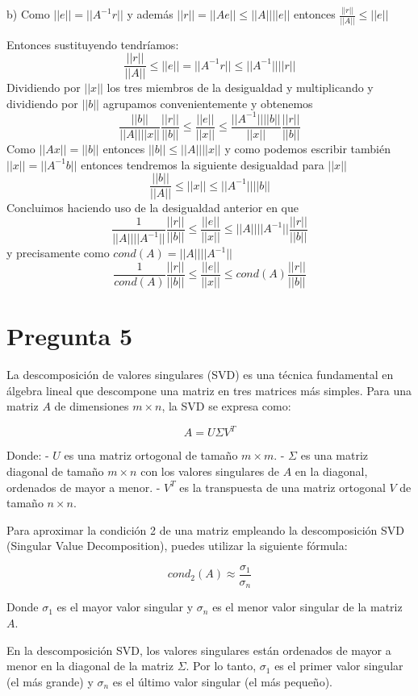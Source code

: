 \documentclass[a4paper,12pt]{article}
\begin{document}
b) Como $||e|| = ||A^{-1} r||$ y además $||r|| = ||A e||\leq ||A|| ||e|| $ entonces $\frac{||r||}{||A||} \leq ||e||$

Entonces sustituyendo tendríamos:
\[\frac{||r||}{||A||} \leq ||e|| = ||A^{-1} r|| \leq ||A^{-1}|||| r||\]
Dividiendo por $||x||$ los tres miembros de la desigualdad y multiplicando y dividiendo por $||b||$ agrupamos convenientemente y obtenemos
\[ \frac{||b||}{||A||||x||} \frac{||r||}{||b||} \leq \frac{||e||}{||x||} \leq \frac{||A^{-1}||||b||}{||x||} \frac{||r||}{||b||}\]
Como $||A x|| = ||b||$ entonces $||b|| \leq ||A|| ||x||$ y como podemos escribir también $||x|| = ||A^{-1} b||$ entonces tendremos la siguiente desigualdad para $||x||$
\[\frac{||b||}{||A||}\leq ||x|| \leq ||A^{-1}|||| b||\]
Concluimos haciendo uso de la desigualdad anterior en que 
\[\frac{1}{||A||||A^{-1}||} \frac{||r||}{||b||} \leq \frac{||e||}{||x||} \leq ||A||||A^{-1}||\frac{||r||}{||b||}\]
y precisamente como $cond(A) =||A||||A^{-1}||$
\[ \frac{1}{cond(A)} \frac{||r||}{||b||} \leq \frac{||e||}{||x||} \leq cond(A)\frac{||r||}{||b||}\]

\section*{Pregunta 5}

La descomposición de valores singulares (SVD) es una técnica fundamental en álgebra lineal que descompone una matriz en tres matrices más simples. Para una matriz \( A \) de dimensiones \( m \times n \), la SVD se expresa como:

\[ A = U \Sigma V^T \]

Donde:
- \( U \) es una matriz ortogonal de tamaño \( m \times m \).
- \( \Sigma \) es una matriz diagonal de tamaño \( m \times n \) con los valores singulares de \( A \) en la diagonal, ordenados de mayor a menor.
- \( V^T \) es la transpuesta de una matriz ortogonal \( V \) de tamaño \( n \times n \).

Para aproximar la condición 2 de una matriz empleando la descomposición SVD (Singular Value Decomposition), puedes utilizar la siguiente fórmula:

\[ {cond}_2(A) \approx \frac{\sigma_1}{\sigma_n} \]

Donde \( \sigma_1 \) es el mayor valor singular y \( \sigma_n \) es el menor valor singular de la matriz \( A \). 

En la descomposición SVD, los valores singulares están ordenados de mayor a menor en la diagonal de la matriz \( \Sigma \). Por lo tanto, \( \sigma_1 \) es el primer valor singular (el más grande) y \( \sigma_n \) es el último valor singular (el más pequeño).
\end{document}
